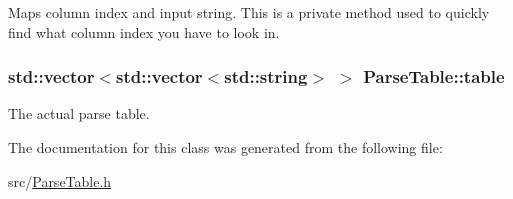 Maps column index and input string. This is a private method used to quickly find what column index you have to look in. 

\hypertarget{classParseTable_a0dbd87ee0d018de6bb990e1ffd8ac26d}{
\subsubsection[{table}]{\setlength{\rightskip}{0pt plus 5cm}std\-::vector$<$std\-::vector$<$std\-::string$>$ $>$ Parse\-Table\-::table\hspace{0.3cm}{\ttfamily [private]}}}\label{classParseTable_a0dbd87ee0d018de6bb990e1ffd8ac26d}


The actual parse table. 



The documentation for this class was generated from the following file\-:\begin{DoxyCompactItemize}
\item 
src/\hyperlink{ParseTable_8h}{Parse\-Table.\-h}\end{DoxyCompactItemize}
